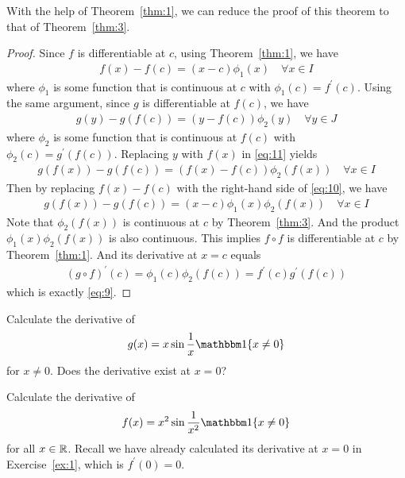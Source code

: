 \documentclass[thmcnt=section, 12pt]{my-elegantbook}
\begin{document}
With the help of Theorem~\ref{thm:1},
we can reduce the proof of this theorem
to that of Theorem~\ref{thm:3}.

\begin{proof}
    Since $f$ is differentiable at $c$, using Theorem~\ref{thm:1}, we have
    \begin{align}
        f(x) - f(c) = (x-c) \phi_1(x)
        \quad \forall x \in I
        \label{eq:10}
    \end{align}
    where $\phi_1$ is some function
    that is continuous at $c$
    with $\phi_1(c) = f^\prime(c)$.
    Using the same argument,
    since $g$ is differentiable at $f(c)$,
    we have
    \begin{align}
        g(y) - g(f(c)) = (y-f(c)) \phi_2(y)
        \quad \forall y \in J
        \label{eq:11}
    \end{align}
    where $\phi_2$ is some function that is continuous at $f(c)$
    with $\phi_2(c) = g^\prime(f(c))$.
    Replacing $y$ with $f(x)$ in \eqref{eq:11} yields
    \begin{align*}
        g(f(x)) - g(f(c)) = (f(x)-f(c)) \phi_2(f(x))
        \quad \forall x \in I
    \end{align*}
    Then by replacing $f(x)-f(c)$
    with the right-hand side of \eqref{eq:10},
    we have
    \begin{align*}
        g(f(x)) - g(f(c)) = (x-c) \phi_1(x) \phi_2(f(x))
        \quad \forall x \in I
    \end{align*}
    Note that $\phi_2(f(x))$ is continuous at $c$
    by Theorem~\ref{thm:3}.
    And the product $\phi_1(x) \phi_2(f(x))$ is also continuous.
    This implies $f \circ f$ is differentiable at $c$
    by Theorem~\ref{thm:1}. And its derivative at $x = c$ equals
    \begin{align*}
        (g \circ f)^\prime(c)
        = \phi_1(c) \phi_2(f(c))
        = f^\prime(c) g^\prime(f(c))
    \end{align*}
    which is exactly \eqref{eq:9}.
\end{proof}

\begin{exercise}
    Calculate the derivative of
    \begin{align*}
        g(x) = x \sin \frac{1}{x} \ind\{x \neq 0\}
    \end{align*}
    for $x \neq 0$. Does the derivative exist at $x = 0$?
    \label{ex:2}
\end{exercise}

\begin{exercise}
    Calculate the derivative of
    \begin{align*}
        f(x) = x^2 \sin \frac{1}{x^2} \ind\{x \neq 0\}
    \end{align*}
    for all $x \in \mathbb{R}$. Recall we have already calculated its derivative at $x = 0$ in Exercise~\ref{ex:1}, which is $f^\prime(0) = 0$.

    \label{ex:3}
\end{exercise}
\end{document}
